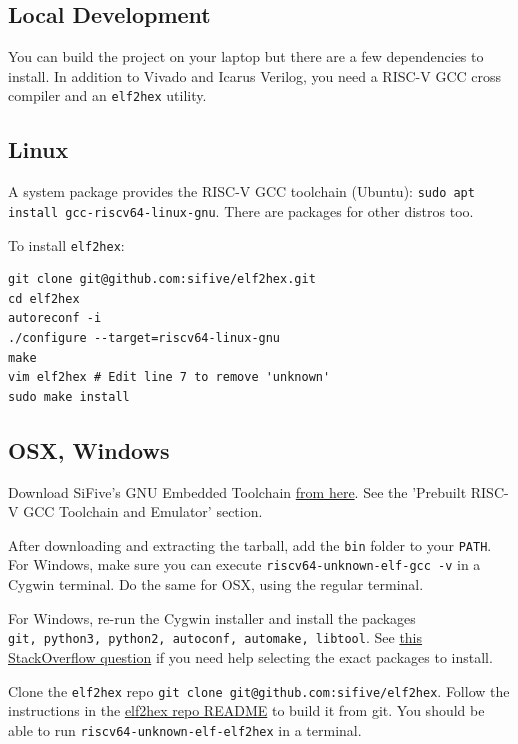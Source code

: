 \documentclass[11pt]{article}
\begin{document}
\begin{appendices}
\section{Local Development}
You can build the project on your laptop but there are a few dependencies to install.
In addition to Vivado and Icarus Verilog, you need a RISC-V GCC cross compiler and an \verb|elf2hex| utility.

\subsection{Linux}
A system package provides the RISC-V GCC toolchain (Ubuntu): \verb|sudo apt install gcc-riscv64-linux-gnu|.
There are packages for other distros too.

To install \verb|elf2hex|:
\begin{verbatim}
git clone git@github.com:sifive/elf2hex.git
cd elf2hex
autoreconf -i
./configure --target=riscv64-linux-gnu
make
vim elf2hex # Edit line 7 to remove 'unknown'
sudo make install
\end{verbatim}

\subsection{OSX, Windows}
Download SiFive's GNU Embedded Toolchain \href{https://www.sifive.com/boards}{from here}.
See the 'Prebuilt RISC-V GCC Toolchain and Emulator' section.

After downloading and extracting the tarball, add the \verb|bin| folder to your \verb|PATH|.
For Windows, make sure you can execute \verb|riscv64-unknown-elf-gcc -v| in a Cygwin terminal.
Do the same for OSX, using the regular terminal.

For Windows, re-run the Cygwin installer and install the packages\\\verb|git, python3, python2, autoconf, automake, libtool|.
See \href{https://stackoverflow.com/questions/47168311/cygwin-and-failed-to-run-aclocal-no-such-file-or-directory}{this StackOverflow question} if you need help selecting the exact packages to install.

Clone the \verb|elf2hex| repo \verb|git clone git@github.com:sifive/elf2hex|.
Follow the instructions in the \href{https://github.com/sifive/elf2hex}{elf2hex repo README} to build it from git.
You should be able to run \verb|riscv64-unknown-elf-elf2hex| in a terminal.

\pagebreak

\end{appendices}
\end{document}
